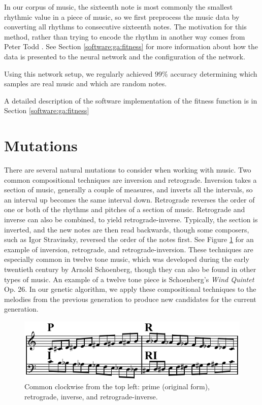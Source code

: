 In our corpus of music, the sixteenth note is most commonly the smallest rhythmic value in a piece of music, so we first preprocess the music data by converting all rhythms to consecutive sixteenth notes.
The motivation for this method, rather than trying to encode the rhythm in another way comes from Peter Todd \cite{todd_connectionist_1989}.
See Section \ref{software:ga:fitness} for more information about how the data is presented to the neural network and the configuration of the network.

Using this network setup, we regularly achieved $99\%$ accuracy determining which samples are real music and which are random notes.

A detailed description of the software implementation of the fitness function is in Section \ref{software:ga:fitness}

\section{Mutations} \label{ga:mutate}

There are several natural mutations to consider when working with music.
Two common compositional techniques are inversion and retrograde.
Inversion takes a section of music, generally a couple of measures, and inverts all the intervals, so an interval up becomes the same interval down.
Retrograde reverses the order of one or both of the rhythms and pitches of a section of music.
Retrograde and inverse can also be combined, to yield retrograde-inverse.
Typically, the section is inverted, and the new notes are then read backwards, though some composers, such as Igor Stravinsky, reversed the order of the notes first.
See Figure \ref{fig:p-r-i-ri} for an example of inversion, retrograde, and retrograde-inversion.
These techniques are especially common in twelve tone music, which was developed during the early twentieth century by Arnold Schoenberg, though they can also be found in other types of music.
An example of a twelve tone piece is Schoenberg's \textit{Wind Quintet} Op. 26.
In our genetic algorithm, we apply these compositional techniques to the melodies from the previous generation to produce new candidates for the current generation.

\begin{figure}
	\centering
	\includegraphics[width=\linewidth]{figures/P-R-I-RI.png}
	\caption{Common  clockwise from the top left: prime (original form), retrograde, inverse, and retrograde-inverse.}
	\label{fig:p-r-i-ri}
\end{figure}

